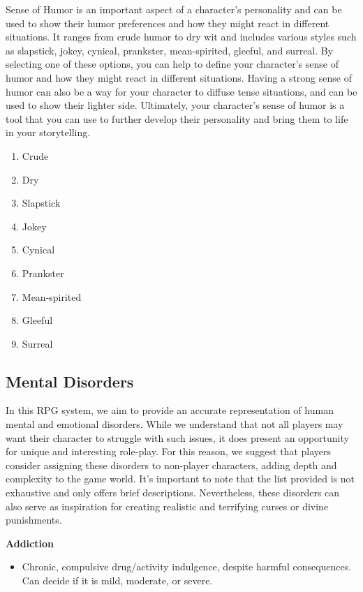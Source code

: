 Sense of Humor is an important aspect of a character's personality and
can be used to show their humor preferences and how they might react in
different situations. It ranges from crude humor to dry wit and includes
various styles such as slapstick, jokey, cynical, prankster,
mean-spirited, gleeful, and surreal. By selecting one of these options,
you can help to define your character's sense of humor and how they
might react in different situations. Having a strong sense of humor can
also be a way for your character to diffuse tense situations, and can be
used to show their lighter side. Ultimately, your character's sense of
humor is a tool that you can use to further develop their personality
and bring them to life in your storytelling.

\begin{enumerate}
\def\labelenumi{\arabic{enumi}.}
\tightlist
\item
  Crude
\item
  Dry
\item
  Slapstick
\item
  Jokey
\item
  Cynical
\item
  Prankster
\item
  Mean-spirited
\item
  Gleeful
\item
  Surreal
\end{enumerate}

\hypertarget{mental-disorders}{%
\subsection{Mental Disorders}\label{mental-disorders}}

In this RPG system, we aim to provide an accurate representation of
human mental and emotional disorders. While we understand that not all
players may want their character to struggle with such issues, it does
present an opportunity for unique and interesting role-play. For this
reason, we suggest that players consider assigning these disorders to
non-player characters, adding depth and complexity to the game world.
It's important to note that the list provided is not exhaustive and only
offers brief descriptions. Nevertheless, these disorders can also serve
as inspiration for creating realistic and terrifying curses or divine
punishments.

\textbf{Addiction}

\begin{itemize}
\tightlist
\item
  Chronic, compulsive drug/activity indulgence, despite harmful
  consequences. Can decide if it is mild, moderate, or severe.
\end{itemize}

